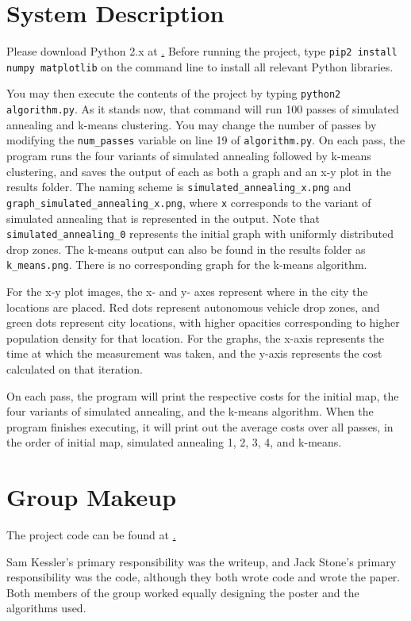 \documentclass[11pt]{article}
\newcommand{\code}[1]{\texttt{#1}}
\begin{document}
\appendix

\section{System Description}

Please download Python 2.x at \href{https://www.python.org/downloads/}. Before running the project, type \code{pip2 install numpy matplotlib} on the command line to install all relevant Python libraries.

You may then execute the contents of the project by typing \code{python2 algorithm.py}. As it stands now, that command will run 100 passes of simulated annealing and k-means clustering. You may change the number of passes by modifying the \code{num\_passes} variable on line 19 of \code{algorithm.py}. On each pass, the program runs the four variants of simulated annealing followed by k-means clustering, and saves the output of each as both a graph and an x-y plot in the results folder. The naming scheme is \code{simulated\_annealing\_x.png} and \code{graph\_simulated\_annealing\_x.png}, where \code{x} corresponds to the variant of simulated annealing that is represented in the output. Note that \code{simulated\_annealing\_0} represents the initial graph with uniformly distributed drop zones. The k-means output can also be found in the results folder as \code{k\_means.png}. There is no corresponding graph for the k-means algorithm.

For the x-y plot images, the x- and y- axes represent where in the city the locations are placed. Red dots represent autonomous vehicle drop zones, and green dots represent city locations, with higher opacities corresponding to higher population density for that location. For the graphs, the x-axis represents the time at which the measurement was taken, and the y-axis represents the cost calculated on that iteration.

On each pass, the program will print the respective costs for the initial map, the four variants of simulated annealing, and the k-means algorithm. When the program finishes executing, it will print out the average costs over all passes, in the order of initial map, simulated annealing 1, 2, 3, 4, and k-means.

\section{Group Makeup}
The project code can be found at \href{https://github.com/JackStoneDev/cs182-final-project}.
\newline

Sam Kessler's primary responsibility was the writeup, and Jack Stone's primary responsibility was the code, although they both wrote code and wrote the paper. Both members of the group worked equally designing the poster and the algorithms used.


 

\end{document}
